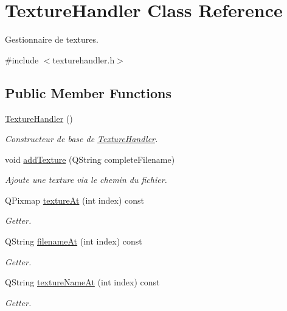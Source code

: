 \hypertarget{class_texture_handler}{}\section{Texture\+Handler Class Reference}
\label{class_texture_handler}


Gestionnaire de textures.  




{\ttfamily \#include $<$texturehandler.\+h$>$}

\subsection*{Public Member Functions}
\begin{DoxyCompactItemize}
\item 
\hyperlink{class_texture_handler_a9056de3d9a44b2e696c8e8b39462dd46}{Texture\+Handler} ()
\begin{DoxyCompactList}\small\item\em Constructeur de base de \hyperlink{class_texture_handler}{Texture\+Handler}. \end{DoxyCompactList}\item 
void \hyperlink{class_texture_handler_a67bc892bd24dfd85bc1eb3af78b8ca40}{add\+Texture} (Q\+String complete\+Filename)
\begin{DoxyCompactList}\small\item\em Ajoute une texture via le chemin du fichier. \end{DoxyCompactList}\item 
Q\+Pixmap \hyperlink{class_texture_handler_a608d66882a46775d1ce498895cf3679b}{texture\+At} (int index) const 
\begin{DoxyCompactList}\small\item\em Getter. \end{DoxyCompactList}\item 
Q\+String \hyperlink{class_texture_handler_a0cdb224be8b1980733698f41b856a55c}{filename\+At} (int index) const 
\begin{DoxyCompactList}\small\item\em Getter. \end{DoxyCompactList}\item 
Q\+String \hyperlink{class_texture_handler_aa6d8737d949687142ffff1e163a15b4f}{texture\+Name\+At} (int index) const 
\begin{DoxyCompactList}\small\item\em Getter. \end{DoxyCompactList}\item 

\end{DoxyCompactItemize}
